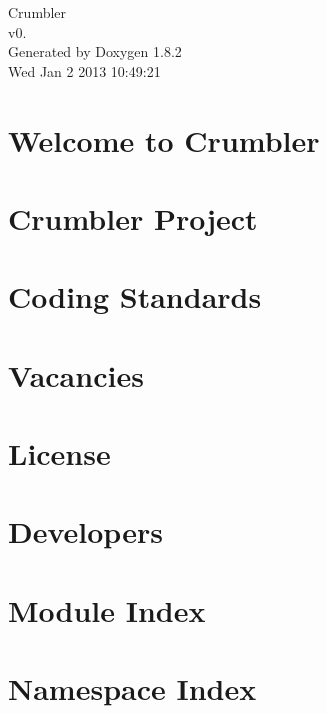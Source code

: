 \documentclass{book}
\begin{document}
\hypersetup{pageanchor=false,citecolor=blue}
\begin{titlepage}
\vspace*{7cm}
\begin{center}
{\Large Crumbler \\[1ex]\large v0. }\\
\vspace*{1cm}
{\large Generated by Doxygen 1.8.2}\\
\vspace*{0.5cm}
{\small Wed Jan 2 2013 10:49:21}\\
\end{center}
\end{titlepage}
\clearemptydoublepage
{}
\tableofcontents
\clearemptydoublepage
{}
\hypersetup{pageanchor=true,citecolor=blue}
\chapter{Welcome to Crumbler}
\label{index}\hypertarget{index}{}
\chapter{Crumbler Project}
\label{proejct}
\hypertarget{proejct}{}

\chapter{Coding Standards}
\label{coding_standards}
\hypertarget{coding_standards}{}

\chapter{Vacancies}
\label{vacancies}
\hypertarget{vacancies}{}

\chapter{License}
\label{license}
\hypertarget{license}{}

\chapter{Developers}
\label{developers}
\hypertarget{developers}{}

\chapter{Module Index}

\chapter{Namespace Index}

\end{document}
